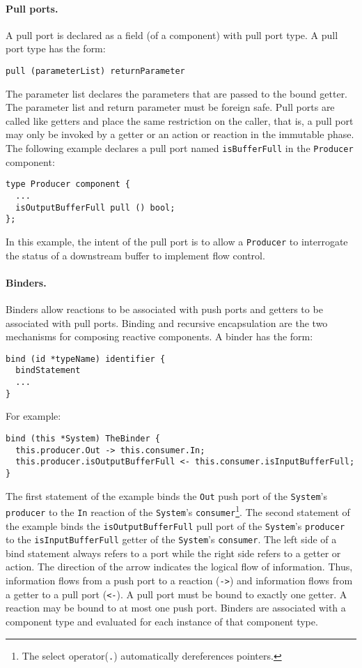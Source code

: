 \paragraph{Pull ports.}
A pull port is declared as a field (of a component) with pull port type.
A pull port type has the form:
\begin{verbatim}
pull (parameterList) returnParameter
\end{verbatim}
The parameter list declares the parameters that are passed to the bound getter.
The parameter list and return parameter must be foreign safe.
Pull ports are called like getters and place the same restriction on the caller, that is, a pull port may only be invoked by a getter or an action or reaction in the immutable phase.
The following example declares a pull port named \verb+isBufferFull+ in the \verb+Producer+ component:
\begin{verbatim}
type Producer component {
  ...
  isOutputBufferFull pull () bool;
};
\end{verbatim}
In this example, the intent of the pull port is to allow a \verb+Producer+ to interrogate the status of a downstream buffer to implement flow control.

\paragraph{Binders.}
Binders allow reactions to be associated with push ports and getters to be associated with pull ports.
Binding and recursive encapsulation are the two mechanisms for composing reactive components.
A binder has the form:
\begin{verbatim}
bind (id *typeName) identifier {
  bindStatement
  ...
}
\end{verbatim}
For example:
\begin{verbatim}
bind (this *System) TheBinder {
  this.producer.Out -> this.consumer.In;
  this.producer.isOutputBufferFull <- this.consumer.isInputBufferFull;
}
\end{verbatim}
The first statement of the example binds the \verb+Out+ push port of the \verb+System+'s \verb+producer+ to the \verb+In+ reaction of the \verb+System+'s \verb+consumer+\footnote{The select operator(\texttt{.}) automatically dereferences pointers.}.
The second statement of the example binds the \verb+isOutputBufferFull+ pull port of the \verb+System+'s \verb+producer+ to the \verb+isInputBufferFull+ getter of the \verb+System+'s \verb+consumer+.
The left side of a bind statement always refers to a port while the right side refers to a getter or action.
The direction of the arrow indicates the logical flow of information.
Thus, information flows from a push port to a reaction (\verb+->+) and information flows from a getter to a pull port (\verb+<-+).
A pull port must be bound to exactly one getter.
A reaction may be bound to at most one push port.
Binders are associated with a component type and evaluated for each instance of that component type.

